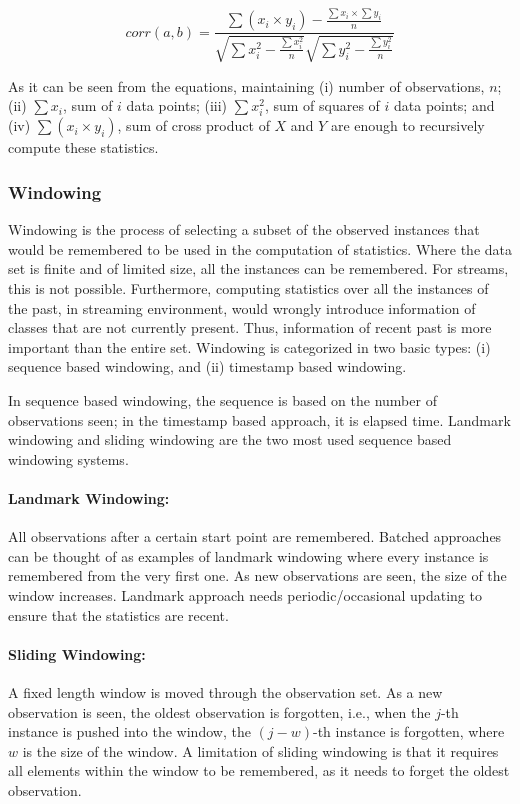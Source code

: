 \begin{equation}
\label{eqn:corr}
    corr(a, b) = \frac{ \sum(x_i \times y_i) - \frac{\sum x_i \times \sum y_i}{n} }{\sqrt{\sum x_i^2 - \frac{\sum x_i^2}{n}} \sqrt{\sum y_i^2 - \frac{\sum y_i^2}{n}}}
\end{equation}

As it can be seen from the equations, maintaining (i) number of observations, $n$; (ii) $\sum x_i$, sum of $i$ data points; (iii) $\sum x_i^2$, sum of squares of $i$ data points; and (iv) $\sum (x_i \times y_i)$, sum of cross product of $X$ and $Y$ are enough to recursively compute these statistics.


\subsubsection{Windowing}
Windowing is the process of selecting a subset of the observed instances that would be remembered to be used in the computation of statistics. Where the data set is finite and of limited size, all the instances can be remembered. For streams, this is not possible. Furthermore, computing statistics over all the instances of the past, in streaming environment, would wrongly introduce information of classes that are not currently present. Thus, information of recent past is more important than the entire set. Windowing is categorized in two basic types: (i) sequence based windowing, and (ii) timestamp based windowing.

In sequence based windowing, the sequence is based on the number of observations seen; in the timestamp based approach, it is elapsed time. Landmark windowing and sliding windowing are the two most used sequence based windowing systems.

\paragraph{Landmark Windowing:} All observations after a certain start point are remembered. Batched approaches can be thought of as examples of landmark windowing where every instance is remembered from the very first one. As new observations are seen, the size of the window increases. Landmark approach needs periodic/occasional updating to ensure that the statistics are recent.

\paragraph{Sliding Windowing:} A fixed length window is moved through the observation set. As a new observation is seen, the oldest observation is forgotten, i.e., when the $j$-th instance is pushed into the window, the $(j-w)$-th instance is forgotten, where $w$ is the size of the window. A limitation of sliding windowing is that it requires all elements within the window to be remembered, as it  needs to forget the oldest observation.

